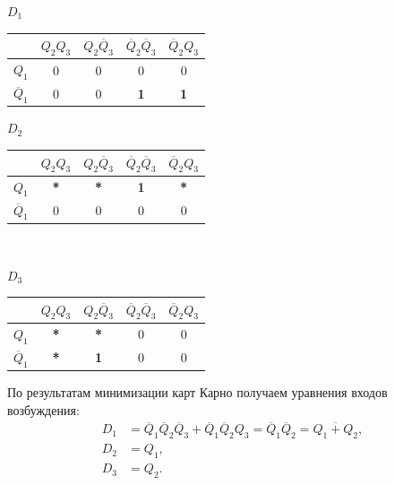 \documentclass[14pt, a4paper]{extarticle}
\begin{document}
	\begin{center}
		\small
		\begin{minipage}{0.32\textwidth}
			\centering
			\textbf{$D_1$}\\[4pt]
			\begin{tabular}{|c|c|c|c|c|}
				\hline
				& $Q_2 Q_3$ & $Q_2 \overline{Q}_3$ & $\overline{Q}_2 \overline{Q}_3$ & $\overline{Q}_2 Q_3$ \\ \hline
				$Q_1$            & 0 & 0 & 0 & 0 \\ \hline
				$\overline{Q}_1$ & 0 & 0 & \textbf{1} & \textbf{1} \\ \hline
			\end{tabular}
		\end{minipage}
		\hfill
		\begin{minipage}{0.32\textwidth}
			\centering
			\textbf{$D_2$}\\[4pt]
			\begin{tabular}{|c|c|c|c|c|}
				\hline
				& $Q_2 Q_3$ & $Q_2 \overline{Q}_3$ & $\overline{Q}_2 \overline{Q}_3$ & $\overline{Q}_2 Q_3$ \\ \hline
				$Q_1$            & \textbf{*} & \textbf{*} & \textbf{1} & \textbf{*} \\ \hline
				$\overline{Q}_1$ & 0 & 0 & 0 & 0 \\ \hline
			\end{tabular}
		\end{minipage}\\
		\begin{minipage}{0.32\textwidth}
			\centering
			\textbf{$D_3$}\\[4pt]
			\begin{tabular}{|c|c|c|c|c|}
				\hline
				& $Q_2 Q_3$ & $Q_2 \overline{Q}_3$ & $\overline{Q}_2 \overline{Q}_3$ & $\overline{Q}_2 Q_3$ \\ \hline
				$Q_1$            & \textbf{*} & \textbf{*} & 0 & 0 \\ \hline
				$\overline{Q}_1$ & \textbf{*} & \textbf{1} & 0 & 0 \\ \hline
			\end{tabular}
		\end{minipage}
	\end{center}
	
	По результатам минимизации карт Карно получаем уравнения входов возбуждения:
	\begin{align*}
		D_1 &= \overline{Q}_1 \overline{Q}_2 \overline{Q}_3 + \overline{Q}_1 \overline{Q}_2 Q_3 = \overline{Q}_1 \overline{Q}_2 = \overline{Q_1 + Q_2}, \\
		D_2 &= Q_1, \\
		D_3 &= Q_2.
	\end{align*}
	
\end{document}
